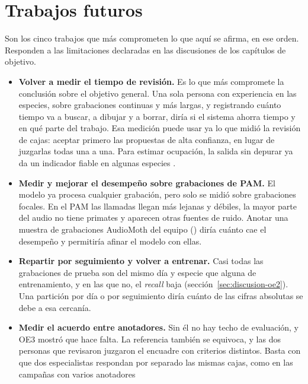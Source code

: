 \section{Trabajos futuros}

Son los cinco trabajos que más comprometen lo que aquí se afirma, en ese orden.
Responden a las limitaciones declaradas en las discusiones de los capítulos de
objetivo.

\begin{itemize}
    \item \textbf{Volver a medir el tiempo de revisión.} Es lo que más
          compromete la conclusión sobre el objetivo general. Una sola persona con
          experiencia en las especies, sobre grabaciones continuas y más largas, y
          registrando cuánto tiempo va a buscar, a dibujar y a borrar, diría si el
          sistema ahorra tiempo y en qué parte del trabajo. Esa medición puede
          usar ya lo que midió la revisión de cajas: aceptar primero las
          propuestas de alta confianza, en lugar de juzgarlas todas una a una.
          Para estimar ocupación, la salida sin depurar ya da un indicador
          fiable en algunas especies \citep{kalan_towards_2015}.
    \item \textbf{Medir y mejorar el desempeño sobre grabaciones de PAM.} El
          modelo ya procesa cualquier grabación, pero solo se midió sobre
          grabaciones focales. En el PAM las llamadas llegan más lejanas y
          débiles, la mayor parte del audio no tiene primates y aparecen otras
          fuentes de ruido. Anotar una muestra de grabaciones AudioMoth del
          equipo (\cpEquipo) diría cuánto cae el desempeño y permitiría afinar el
          modelo con ellas.
    \item \textbf{Repartir por seguimiento y volver a entrenar.} Casi todas las
          grabaciones de prueba son del mismo día y especie que alguna de
          entrenamiento, y en las que no, el \textit{recall} baja
          (sección~\ref{sec:discusion-oe2}). Una partición por día o por
          seguimiento diría cuánto de las cifras absolutas se debe a esa cercanía.
    \item \textbf{Medir el acuerdo entre anotadores.} Sin él no hay techo de
          evaluación, y OE3 mostró que hace falta. La referencia también se
          equivoca, y las dos personas que revisaron juzgaron el encuadre con
          criterios distintos. Basta con que dos especialistas respondan por
          separado las mismas cajas, como en las campañas con varios anotadores

\end{itemize}
